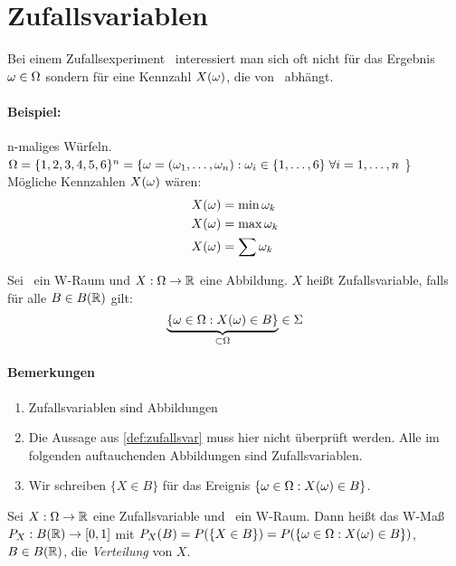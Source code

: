 \section{Zufallsvariablen}
Bei einem Zufallsexperiment \wraum\ interessiert man sich oft nicht für das
Ergebnis $\omega \in \Omega$ sondern für eine Kennzahl $X(\omega)$, die von \w\ abhängt.

\paragraph{Beispiel:} n-maliges Würfeln.\\
$\Omega  = \{1,2,3,4,5,6\}^n = \{ \omega = (\omega_1, \dots, \omega_n): \omega_i \in \{1, \dots, 6\} \; \forall i=1, \dots, n$ \}\\
Mögliche Kennzahlen $X(\omega)$ wären:
\begin{align*}
    X(\omega) & = \min \omega_k \\
    X(\omega) & = \max \omega_k \\
    X(\omega) & = \sum \omega_k
\end{align*}

\begin{definition}[Zufallsvariable]
    \label{def:zufallsvar}
    Sei \wraum\ ein W-Raum und $X: \Omega \to \mathbb{R}$ eine Abbildung.
    $X$ heißt Zufallsvariable, falls für alle $B \in B(\mathbb{R})$ gilt:
    \begin{equation*}
        \underbrace{\{\omega \in \Omega: X(\omega) \in B\}}_{\subset \Omega} \in \Sigma
    \end{equation*}
\end{definition}

\paragraph{Bemerkungen}
\begin{enumerate}
    \item Zufallsvariablen sind Abbildungen
    \item Die Aussage aus \autoref{def:zufallsvar} muss hier nicht überprüft
          werden.
          Alle im folgenden auftauchenden Abbildungen sind Zufallsvariablen.
    \item Wir schreiben $\{X \in B\}$ für das Ereignis
          $\{\omega \in \Omega: X(\omega) \in B\}$.
\end{enumerate}

\begin{definition}
    Sei $X: \Omega \to \mathbb{R}$ eine Zufallsvariable und \wraum\ ein W-Raum.
    Dann heißt das W-Maß $P_X: B(\mathbb{R}) \to [0,1]$ mit
    $P_X(B) = P(\{X \in B\}) = P(\{\omega \in \Omega: X(\omega) \in B\})$, $B \in B(\mathbb{R})$,
    die \emph{Verteilung} von $X$.
\end{definition}

